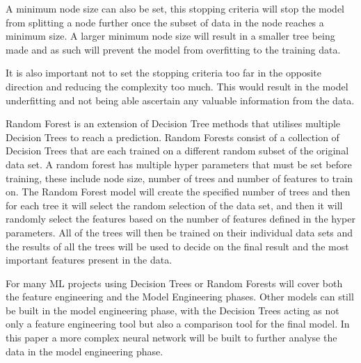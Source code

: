 \documentclass{imc-inf}
\begin{document}
	A minimum node size can also be set, this stopping criteria will stop the model from splitting a node further once the subset of data in the node reaches a minimum size. A larger minimum node size will result in a smaller tree being made and as such will prevent the model from overfitting to the training data. 
	
	It is also important not to set the stopping criteria too far in the opposite direction and reducing the complexity too much. This would result in the model underfitting and not being able ascertain any valuable information from the data. 
 	\newline
 	
 	Random Forest is an extension of Decision Tree methods that utilises multiple Decision Trees to reach a prediction. Random Forests consist of a collection of Decision Trees that are each trained on a different random subset of the original data set. A random forest has multiple hyper parameters that must be set before training, these include node size, number of trees and number of features to train on. The Random Forest model will create the specified number of trees and then for each tree it will select the random selection of the data set, and then it will randomly select the features based on the number of features defined in the hyper parameters. All of the trees will then be trained on their individual data sets and the results of all the trees will be used to decide on the final result and the most important features present in the data.
 	\newline
 	
 	For many ML projects using Decision Trees or Random Forests will cover both the feature engineering and the Model Engineering phases. Other models can still be built in the model engineering phase, with the Decision Trees acting as not only a feature engineering tool but also a comparison tool for the final model. In this paper a more complex neural network will be built to further analyse the data in the model engineering phase.
 	
\end{document}
